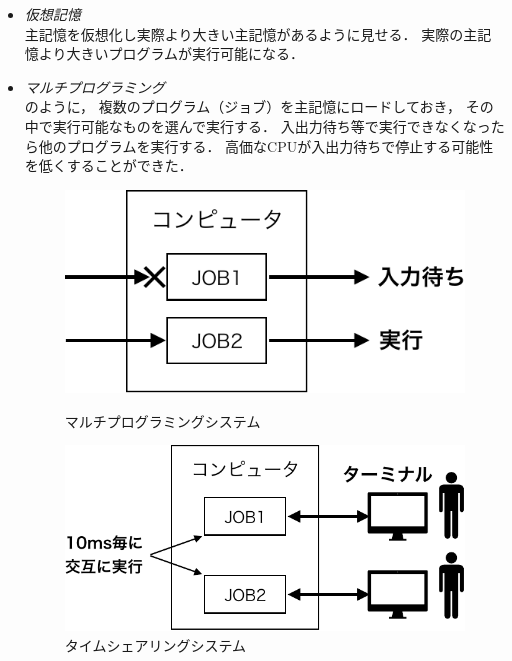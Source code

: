 \begin{itemize}
\item \emph{仮想記憶} \\
  主記憶を仮想化し実際より大きい主記憶があるように見せる．
  実際の主記憶より大きいプログラムが実行可能になる．

\item \emph{マルチプログラミング} \\
  \label{multiprogramming}
  のように，
  複数のプログラム（ジョブ）を主記憶にロードしておき，
  その中で実行可能なものを選んで実行する．
  入出力待ち等で実行できなくなったら他のプログラムを実行する．
  高価なCPUが入出力待ちで停止する可能性を低くすることができた．

  \begin{figure}[btp]
    \begin{center}
      \begin{minipage}{0.49\columnwidth}
        \centerline{
          \includegraphics[scale=0.66]{Fig/multiprogramming-crop.pdf}}
        \caption{マルチプログラミングシステム}\label{fig:multiprogramming}
      \end{minipage}
      \begin{minipage}{0.49\columnwidth}
        \centerline{
          \includegraphics[scale=0.66]{Fig/timesharing-crop.pdf}}
        \caption{タイムシェアリングシステム}\label{fig:timesharing}
      \end{minipage}
    \end{center}
  \end{figure}


\end{itemize}

